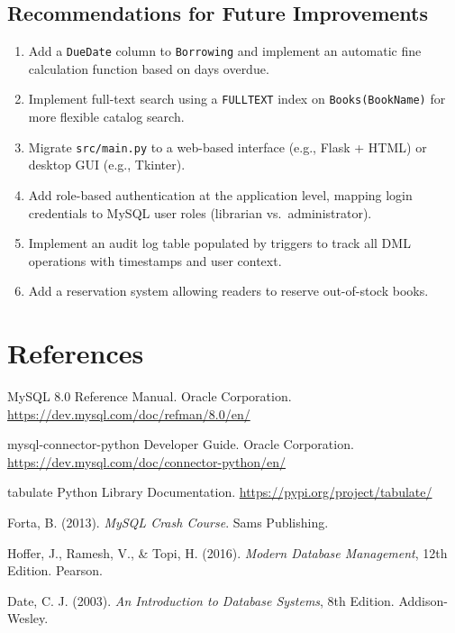 \documentclass[12pt,a4paper,oneside]{report}
\begin{document}
\section{Recommendations for Future Improvements}

\begin{enumerate}
  \item Add a \texttt{DueDate} column to \texttt{Borrowing} and implement an automatic
        fine calculation function based on days overdue.
  \item Implement full-text search using a \texttt{FULLTEXT} index on
        \texttt{Books(BookName)} for more flexible catalog search.
  \item Migrate \texttt{src/main.py} to a web-based interface (e.g., Flask + HTML)
        or desktop GUI (e.g., Tkinter).
  \item Add role-based authentication at the application level, mapping login credentials
        to MySQL user roles (librarian vs.\ administrator).
  \item Implement an audit log table populated by triggers to track all DML operations
        with timestamps and user context.
  \item Add a reservation system allowing readers to reserve out-of-stock books.
\end{enumerate}

\chapter*{References}

\begin{enumerate}[label={[\arabic*]}]
  \item MySQL 8.0 Reference Manual. Oracle Corporation.
        \url{https://dev.mysql.com/doc/refman/8.0/en/}
  \item mysql-connector-python Developer Guide. Oracle Corporation.
        \url{https://dev.mysql.com/doc/connector-python/en/}
  \item tabulate Python Library Documentation.
        \url{https://pypi.org/project/tabulate/}
  \item Forta, B. (2013). \textit{MySQL Crash Course}. Sams Publishing.
  \item Hoffer, J., Ramesh, V., \& Topi, H. (2016). \textit{Modern Database Management},
        12th Edition. Pearson.
  \item Date, C. J. (2003). \textit{An Introduction to Database Systems}, 8th Edition.
        Addison-Wesley.
\end{enumerate}
\end{document}
